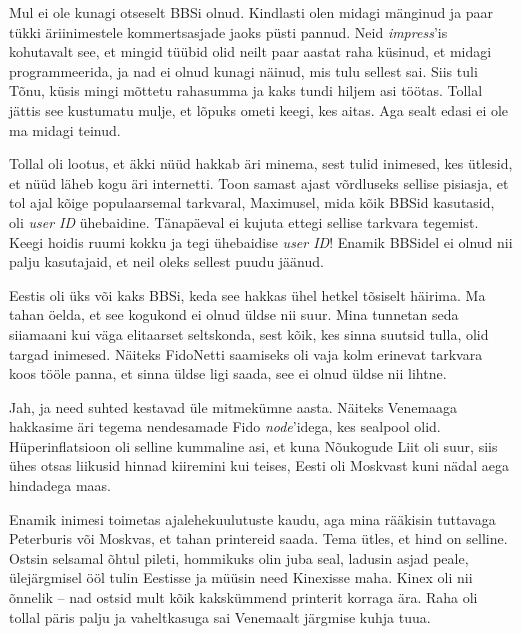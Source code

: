 Mul ei ole kunagi otseselt BBSi olnud. Kindlasti olen midagi mänginud ja paar tükki äriinimestele kommertsasjade jaoks püsti pannud. Neid 
\emph{impress}'is kohutavalt see, et mingid tüübid olid neilt paar 
aastat raha küsinud, et midagi programmeerida, ja nad ei olnud kunagi näinud, 
mis tulu sellest sai. Siis tuli Tõnu, küsis mingi mõttetu 
rahasumma ja kaks tundi hiljem asi töötas. Tollal jättis see
kustumatu mulje, et lõpuks ometi keegi, kes aitas. Aga sealt edasi 
ei ole ma midagi teinud. 


Tollal oli lootus, et äkki nüüd hakkab äri minema, sest tulid inimesed, kes 
ütlesid, et nüüd läheb kogu äri internetti. Toon samast ajast 
võrdluseks sellise pisiasja, et tol ajal kõige populaarsemal tarkvaral, 
Maximusel, mida kõik BBSid kasutasid, oli \emph{user ID} ühebaidine. Tänapäeval ei kujuta ettegi sellise tarkvara tegemist. 
Keegi hoidis ruumi kokku ja tegi ühebaidise \emph{user ID}! Enamik BBSidel ei 
olnud nii palju kasutajaid, et neil oleks sellest puudu jäänud. 


Eestis oli üks või kaks BBSi, keda see hakkas ühel hetkel tõsiselt häirima. Ma 
tahan öelda, et see kogukond ei olnud üldse nii suur. Mina tunnetan seda siiamaani 
kui väga elitaarset seltskonda, sest kõik, kes sinna 
suutsid tulla, olid targad inimesed. Näiteks FidoNetti saamiseks oli vaja kolm erinevat tarkvara koos tööle 
panna, et sinna üldse ligi saada, see ei olnud üldse nii lihtne. 


Jah, ja need suhted kestavad üle mitmekümne aasta. 
Näiteks Venemaaga hakkasime äri tegema nendesamade Fido \emph{node}'idega, 
kes sealpool olid. Hüperinflatsioon oli selline kummaline asi, et kuna 
Nõukogude Liit oli suur, siis ühes otsas liikusid hinnad kiiremini kui teises, 
Eesti oli Moskvast kuni nädal aega hindadega maas. 


Enamik inimesi toimetas ajalehekuulutuste kaudu, aga mina rääkisin tuttavaga Peterburis või Moskvas, et 
tahan printereid saada. Tema ütles, et hind on selline. 
Ostsin selsamal õhtul pileti, hommikuks olin juba seal, ladusin asjad 
peale, ülejärgmisel ööl tulin Eestisse ja müüsin need 
Kinexisse maha. Kinex oli 
nii õnnelik -- nad ostsid mult kõik kakskümmend printerit korraga ära. Raha oli tollal
päris palju ja vaheltkasuga sai Venemaalt järgmise kuhja tuua.

